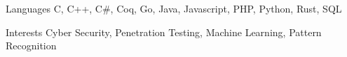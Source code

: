 
\begin{cvskills}
  \cvskill
    {Languages}
    {C, C++, C\#, Coq, Go, Java, Javascript, PHP, Python, Rust, SQL}

  \cvskill
    {Interests}
    {Cyber Security, Penetration Testing, Machine Learning, Pattern Recognition}
\end{cvskills}
